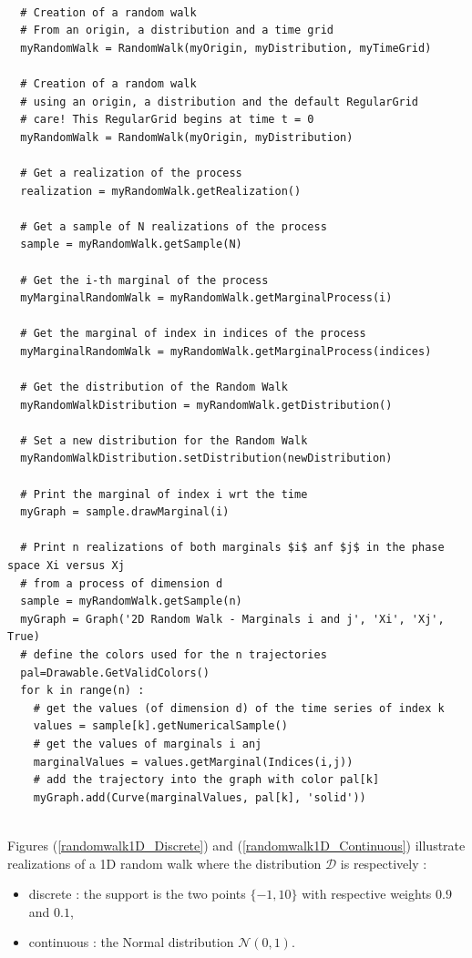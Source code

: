 \begin{lstlisting}

  # Creation of a random walk
  # From an origin, a distribution and a time grid
  myRandomWalk = RandomWalk(myOrigin, myDistribution, myTimeGrid)

  # Creation of a random walk
  # using an origin, a distribution and the default RegularGrid 
  # care! This RegularGrid begins at time t = 0
  myRandomWalk = RandomWalk(myOrigin, myDistribution)

  # Get a realization of the process
  realization = myRandomWalk.getRealization()

  # Get a sample of N realizations of the process
  sample = myRandomWalk.getSample(N)

  # Get the i-th marginal of the process
  myMarginalRandomWalk = myRandomWalk.getMarginalProcess(i)

  # Get the marginal of index in indices of the process   
  myMarginalRandomWalk = myRandomWalk.getMarginalProcess(indices)

  # Get the distribution of the Random Walk
  myRandomWalkDistribution = myRandomWalk.getDistribution()

  # Set a new distribution for the Random Walk
  myRandomWalkDistribution.setDistribution(newDistribution)
 
  # Print the marginal of index i wrt the time
  myGraph = sample.drawMarginal(i)

  # Print n realizations of both marginals $i$ anf $j$ in the phase space Xi versus Xj
  # from a process of dimension d 
  sample = myRandomWalk.getSample(n)
  myGraph = Graph('2D Random Walk - Marginals i and j', 'Xi', 'Xj', True)
  # define the colors used for the n trajectories
  pal=Drawable.GetValidColors()
  for k in range(n) : 
    # get the values (of dimension d) of the time series of index k
    values = sample[k].getNumericalSample()
    # get the values of marginals i anj
    marginalValues = values.getMarginal(Indices(i,j))
    # add the trajectory into the graph with color pal[k]
    myGraph.add(Curve(marginalValues, pal[k], 'solid'))
  \end{lstlisting}

\textspace\\
Figures (\ref{randomwalk1D_Discrete}) and (\ref{randomwalk1D_Continuous}) illustrate realizations of a 1D random walk where the distribution $\mathcal{D}$ is respectively :
\begin{itemize}
  \item discrete :  the support is the two points $\{-1, 10\}$ with respective weights $0.9$ and $0.1$,
  \item continuous : the Normal distribution $\mathcal{N}(0,1)$.
\end{itemize}



